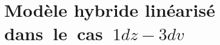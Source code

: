 \renewcommand{\localPath}{chap3}

\chapter{Modèle hybride linéarisé dans~le~cas~$1dz-3dv$}









